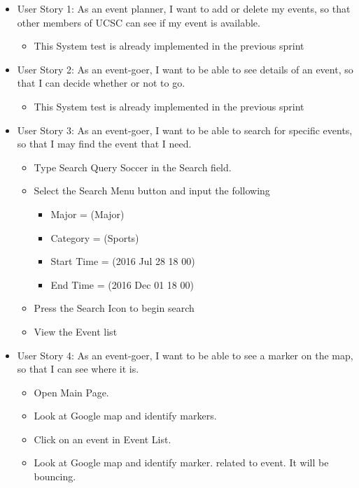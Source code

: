 \documentclass[10pt]{article}
\begin{document}
	    \begin{itemize}
	    	\item User Story 1: As an event planner, I want to add or delete my events, so that other members of UCSC can see if my event is available.
	    	\begin{itemize}
	    		\item This System test is already implemented in the previous sprint
	    	\end{itemize}
	    	
	    	\item User Story 2: As an event-goer, I want to be able to see details of an event, so that I can decide whether or not to go.
	    	\begin{itemize}
	    		\item This System test is already implemented in the previous sprint
	    	\end{itemize}
	    	
	    	\item User Story 3: As an event-goer, I want to be able to search for specific events, so that I may find the event that I need.
	    	\begin{itemize}
	    		\item Type Search Query Soccer in the Search field.
	    		\item Select the Search Menu button and input the following
	    		\begin{itemize}
	    			\item Major = (Major)
	    			\item Category = (Sports)
	    			\item Start Time = (2016 Jul 28 18 00)
	    			\item End Time = (2016 Dec 01 18 00)
		    	\end{itemize}
		    	\item Press the Search Icon to begin search
		    	\item View the Event list 
		    \end{itemize}
	  
	    	\item User Story 4: As an event-goer, I want to be able to see a marker on the map, so that I can see where it is.
	    	\begin{itemize}
	    		\item Open Main Page.
	    		\item Look at Google map and identify markers.
	    		\item Click on an event in Event List.
	    		\item Look at Google map and identify marker. related to event. It will be bouncing.
	    	\end{itemize}
	    	

\end{itemize}
\end{document}
